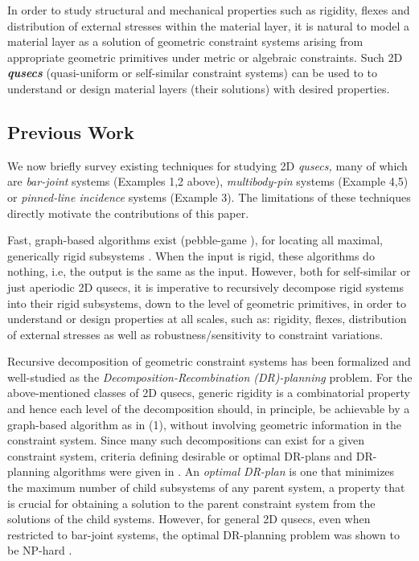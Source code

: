 In order to study structural and mechanical properties such as rigidity, flexes and distribution of external stresses 
within the material layer, it is natural to model a material layer as a solution of geometric constraint systems 
arising from appropriate geometric primitives under metric or algebraic constraints. 
Such  2D {\bf{\em qusecs}} (quasi-uniform or self-similar constraint systems) can be used to 
to understand or design material layers (their solutions) with desired properties.

\subsection{Previous Work}
We now briefly survey existing techniques for studying 2D {\em qusecs,}  many of which are
{\it bar-joint} systems (Examples 1,2 above), {\it multibody-pin} systems (Example 4,5) or {\it pinned-line incidence} systems (Example 3). 
The limitations of these techniques directly motivate the contributions of this paper.

\medskip\noindent{}
Fast, graph-based algorithms exist (pebble-game \cite{XX}),   
for locating all maximal, generically rigid subsystems \cite{XX}. 
When the input is rigid, these algorithms do nothing, i.e, the output is the same as the input.
However, both for self-similar or just aperiodic 2D qusecs, it is imperative to recursively decompose rigid systems 
into their rigid subsystems, down to the level of geometric primitives, in order to 
understand or design properties at all scales, such as: rigidity, flexes, distribution 
of external stresses as well as robustness/sensitivity to constraint variations.
 
\medskip\noindent{}
Recursive decomposition of geometric constraint systems has been formalized \cite{XX} and well-studied \cite{XX} 
as the {\sl Decomposition-Recombination (DR)-planning} problem.
For the above-mentioned classes of 2D qusecs, generic rigidity is 
a combinatorial property and hence each level of the decomposition should, in principle, be achievable by a graph-based algorithm as in (1), without
involving geometric information in the constraint system.  
Since many  such decompositions can exist for a given constraint system, 
criteria defining desirable or optimal DR-plans and DR-planning algorithms were given in \cite{XX}. An {\em optimal DR-plan} is one
that minimizes the maximum number of child subsystems of any parent system, a property that is 
crucial for obtaining a solution to the parent constraint system from the solutions of the child systems.
However, for general 2D qusecs, even when restricted to bar-joint systems, 
the optimal DR-planning problem was shown to be NP-hard \cite{XX}.

